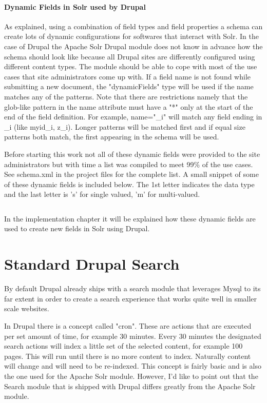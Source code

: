\paragraph{Dynamic Fields in Solr used by Drupal}
As explained, using a combination of field types and field properties a schema can create lots of dynamic configurations for softwares that interact with Solr. In the case of Drupal the Apache Solr Drupal module does not know in advance how the schema should look like because all Drupal sites are differently configured using different content types. The module should be able to cope with most of the use cases that site administrators come up with. If a field name is not found while submitting a new document, the "dynamicFields" type will be used if the name matches any of the patterns. Note that there are restrictions namely that the glob-like pattern in the name attribute must have a "*" only at the start of the end of the field definition. For example, name="\*\_i" will match any field ending in \_i (like myid\_i, z\_i). Longer patterns will be matched first and if equal size patterns both match, the first appearing in the schema will be used.
 
Before starting this work not all of these dynamic fields were provided to the site administrators but with time a list was compiled to meet 99\% of the use cases.  See schema.xml in the project files for the complete list. A small snippet of some of these dynamic fields is included below. The 1st letter indicates the data type and the last letter is 's' for single valued, 'm' for multi-valued.

\inputminted[fontsize=\scriptsize,linenos]{xml}{./code_examples/schema_dynamicfields.xml}

\noindent In the implementation chapter it will be explained how these dynamic fields are used to create new fields in Solr using Drupal.


\section{Standard Drupal Search}
By default Drupal already ships with a search module that leverages Mysql to its far extent in order to create a search experience that works quite well in smaller scale websites.

In Drupal there is a concept called "cron". These are actions that are executed per set amount of time, for example 30 minutes. Every 30 minutes the designated search actions will index a little set of the selected content, for example 100 pages. This will run until there is no more content to index. Naturally content will change and will need to be re-indexed. This concept is fairly basic and is also the one used for the Apache Solr module. 
However, I'd like to point out that the Search module that is shipped with Drupal differs greatly from the Apache Solr module. 

